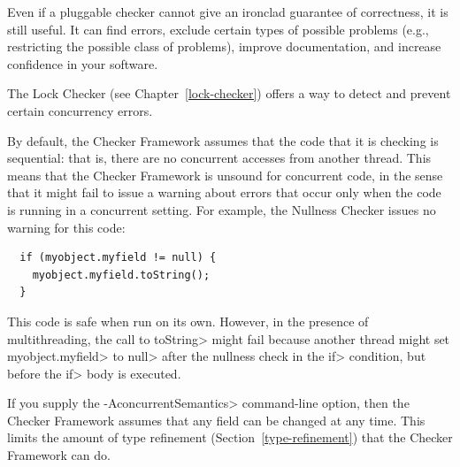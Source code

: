 
Even if a pluggable checker cannot give an ironclad
guarantee of correctness, it is still useful.  It can find errors,
exclude certain types of possible problems (e.g., restricting the
possible class of problems), improve documentation, and increase confidence
in your software.



The Lock Checker (see Chapter~\ref{lock-checker}) offers a way to detect
and prevent certain concurrency errors.


By default, the Checker Framework assumes that the code that it is checking
is sequential:  that is, there are no concurrent accesses from another
thread.  This means that the Checker Framework is unsound for concurrent
code, in the sense that it might fail to issue a warning about errors that
occur only when the code is running in a concurrent setting.
For example, the Nullness Checker issues no warning for this
code:

\begin{Verbatim}
  if (myobject.myfield != null) {
    myobject.myfield.toString();
  }
\end{Verbatim}

\noindent
This code is safe when run on its own.
However, in the presence of multithreading, the call to \<toString> might
fail because another thread might set \<myobject.myfield> to \<null> after
the nullness check in the \<if> condition, but before the \<if> body is
executed.

If you supply the \<-AconcurrentSemantics> command-line option, then the
Checker Framework assumes that any field can be changed at any time.  This
limits the amount of type refinement
(Section~\ref{type-refinement}) that the Checker Framework can do.


%
%
%
%
%
%
%


